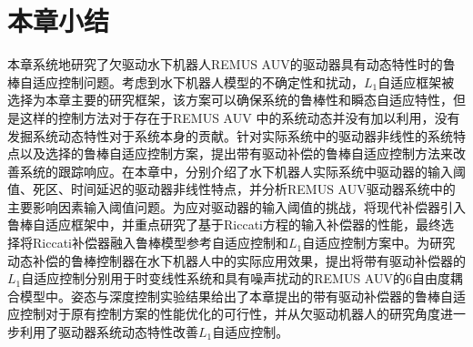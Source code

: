 


\section{本章小结 }

本章系统地研究了欠驱动水下机器人REMUS AUV的驱动器具有动态特性时的鲁棒自适应控制问题。考虑到水下机器人模型的不确定性和扰动，$L_1$自适应框架被选择为本章主要的研究框架，该方案可以确保系统的鲁棒性和瞬态自适应特性，但是这样的控制方法对于存在于REMUS AUV 中的系统动态并没有加以利用，没有发掘系统动态特性对于系统本身的贡献。针对实际系统中的驱动器非线性的系统特点以及选择的鲁棒自适应控制方案，提出带有驱动补偿的鲁棒自适应控制方法来改善系统的跟踪响应。在本章中，分别介绍了水下机器人实际系统中驱动器的输入阈值、死区、时间延迟的驱动器非线性特点，并分析REMUS AUV驱动器系统中的主要影响因素输入阈值问题。为应对驱动器的输入阈值的挑战，将现代补偿器引入鲁棒自适应框架中，并重点研究了基于Riccati方程的输入补偿器的性能，最终选择将Riccati补偿器融入鲁棒模型参考自适应控制和$L_1$自适应控制方案中。为研究动态补偿的鲁棒控制器在水下机器人中的实际应用效果，提出将带有驱动补偿器的$L_{1}$自适应控制分别用于时变线性系统和具有噪声扰动的REMUS AUV的6自由度耦合模型中。姿态与深度控制实验结果给出了本章提出的带有驱动补偿器的鲁棒自适应控制对于原有控制方案的性能优化的可行性，并从欠驱动机器人的研究角度进一步利用了驱动器系统动态特性改善$L_1$自适应控制。
